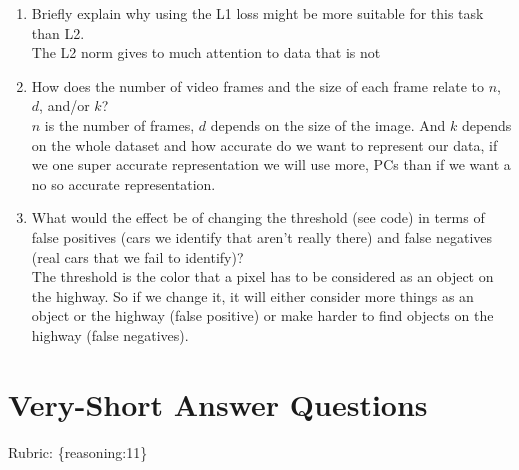\documentclass{article}
\def\rubric#1{\gre{Rubric: \{#1\}}}{}
\def\gre#1{{\color{gre}#1}}
\def\ans#1{{\color{ans}#1}}
\def\enum#1{\begin{enumerate}#1\end{enumerate}}
\begin{document}
\enum{
\item Briefly explain why using the L1 loss might be more suitable for this task than L2. \\
\ans{
    The L2 norm gives to much attention to data that is not 
}
\item How does the number of video frames and the size of each frame relate to $n$, $d$, and/or $k$? \\
\ans{
    $n$ is the number of frames, $d$ depends on the size of the image. And $k$ 
    depends on the whole dataset and how accurate do we want to represent our 
    data, if we one super accurate representation we will use more, PCs than if we want a no so 
    accurate representation.
}
\item What would the effect be of changing the threshold (see code) in terms of false positives (cars we identify that aren't really there) and false negatives (real cars that we fail to identify)? \\
\ans{
    The threshold is the color that a pixel has to be considered as an object on the highway. So if 
    we change it, it will either consider more things as an object or the highway (false positive) 
    or make harder to find objects on the highway (false negatives).
}
}

\section{Very-Short Answer Questions}
\rubric{reasoning:11}
\end{document}
